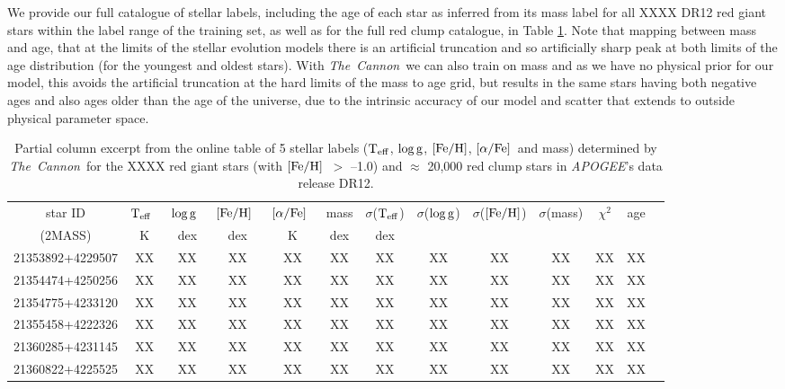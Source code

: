 \documentclass[12pt, preprint]{aastex}
\newcommand{\project}[1]{\textsl{#1}}
\newcommand{\tc}{\project{The~Cannon}}
\newcommand{\apogee}{\project{APOGEE}}
\newcommand{\teff}{\mbox{$\rm T_{eff}$}}
\newcommand{\feh}{\mbox{$\rm [Fe/H]$}}
\newcommand{\alphafe}{\mbox{$\rm [\alpha/Fe]$}}
\newcommand{\logg}{\mbox{$\rm \log g$}}
\begin{document}
We provide our full catalogue of stellar labels, including the age of each star as inferred from its mass label for all XXXX DR12 red giant stars within the label range of the training set, as well as for the full red clump catalogue, in Table \ref{tab:online}. Note that mapping between mass and age, that at the limits of the stellar evolution models there is an artificial truncation and so artificially sharp peak at both limits of the age distribution (for the youngest and oldest stars). With \tc\ we can also train on mass and as we have no physical prior for our model, this avoids the artificial truncation at the hard limits of the mass to age grid, but results in the same stars having both negative ages and also ages older than the age of the universe, due to the intrinsic accuracy of our model and scatter that extends to outside physical parameter space. 

\begin{table}[!h]
\tiny{
\centering
\caption{Partial column excerpt from the online table of 5 stellar labels (\teff, \logg, \feh, \alphafe\ and mass) determined by \tc\ for the XXXX red giant stars (with \feh\ $>$ --1.0) and $\approx$ 20,000 red clump stars in \apogee 's data release DR12. } 
\begin{tabular}{| c | c | c |  c | c | c |  c | c | c | c | c | c | c | } %
\hline
\small{star ID}  & \teff\ & \logg\ & \feh\ & \alphafe\ & mass & $\sigma$(\teff) & $\sigma$(\logg) & $\sigma$(\feh) & $\sigma$(mass)& $\chi^2$ & \tiny{age} \\
\small{(2MASS)} & K & dex &  dex  & K & dex & dex &  & & & &    \\    
\hline
\tiny{21353892+4229507} & XX & XX  & XX  & XX & XX  & XX  & XX & XX & XX & XX & XX\\
\tiny{21354474+4250256} & XX & XX  & XX  & XX & XX  & XX  & XX & XX & XX & XX & XX\\
\tiny{21354775+4233120} & XX & XX  & XX  & XX & XX  & XX  & XX & XX & XX& XX & XX \\
\tiny{21355458+4222326} & XX & XX  & XX  & XX & XX  & XX  & XX & XX & XX & XX & XX\\
\tiny{21360285+4231145} & XX & XX  & XX  & XX & XX  & XX  & XX & XX & XX & XX & XX\\
\tiny{21360822+4225525} & XX & XX  & XX  & XX & XX  & XX  & XX & XX & XX & XX & XX\\
\hline
\end{tabular}
\label{tab:online} }
\end{table}  
\end{document}
